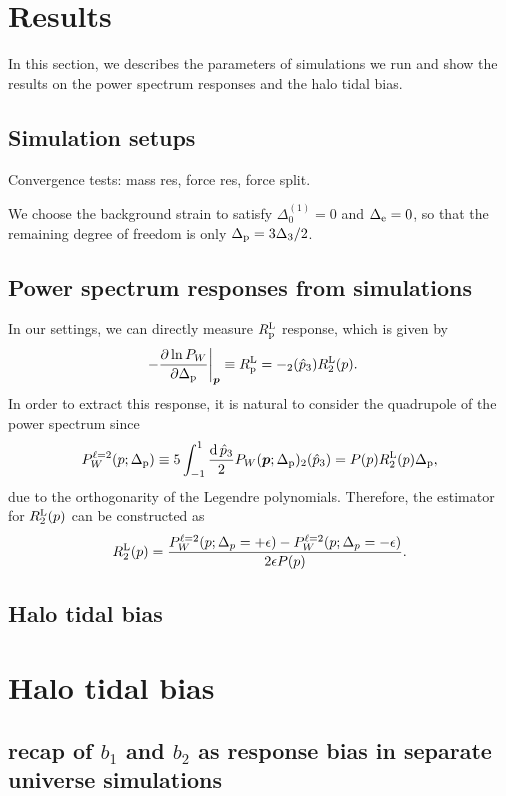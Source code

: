 \documentclass[a4paper,11pt]{article}
\let\L\relax
\DeclareMathOperator{\L}{\mathcal{L}}
\renewcommand{\d}{\mathrm{d}}
\newcommand{\vp}{{\bm p}}
\newcommand{\Lagrange}{\mathrm{L}}
\begin{document}
\section{Results}
\label{sec:results}
In this section, we describes the parameters of simulations we run and show the results on the power spectrum responses and the halo tidal bias.

\subsection{Simulation setups}
Convergence tests: mass res, force res, force split.

We choose the background strain to satisfy
$\Delta^{(1)}_0=0$ and $\Delta_{\rm e}=0$, so that the remaining degree of freedom is only $\Delta_{\rm p} = 3\Delta_3/2$.

\subsection{Power spectrum responses from simulations}
In our settings, we can directly measure $R^{\rm L}_{\rm p}$ response, which is given by
\begin{align}
-\frac{\partial\ln P_W}{\partial\Delta_{\rm p}} \bigg|_\vp
    &\equiv R^{\rm L}_{\rm p}
    = - \L_2(\hat p_3) R^\Lagrange_2(p).
\end{align}
In order to extract this response, it is natural to consider the quadrupole of the power spectrum since
\begin{align}
P^{\ell=2}_W(p;\Delta_{\rm p}) \equiv 
5\int_{-1}^{1} \frac{\d\,\hat p_3}{2} P_W(\vp;\Delta_{\rm p}) \L_2(\hat p_3)
=P(p)R_2^{\rm L}(p)\Delta_{\rm p},
\end{align}
due to the orthogonarity of the Legendre polynomials.
Therefore, the estimator for $R_2^{\rm L}(p)$ can be constructed as 
\begin{align}
R_2^{\rm L}(p) = \frac{P_W^{\ell=2}(p;\Delta_p=+\epsilon) - P_W^{\ell=2}(p;\Delta_p=-\epsilon)}{2\epsilon P(p)}.
\end{align}


\subsection{Halo tidal bias}


\section{Halo tidal bias}
\label{sec:bias}
\subsection{recap of $b_1$ and $b_2$ as response bias in separate universe simulations}
\end{document}
